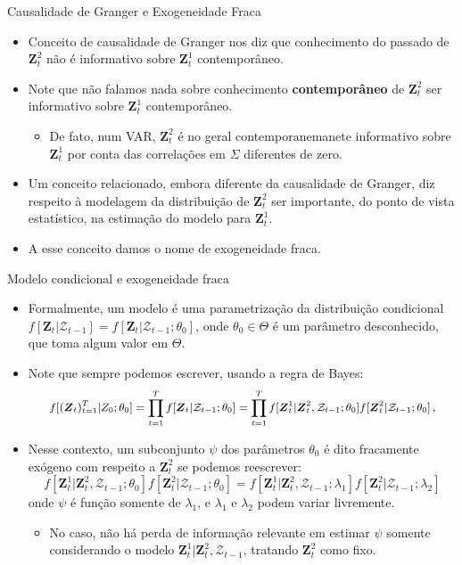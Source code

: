 \documentclass[11pt]{beamer}
\begin{document}
\begin{frame}{Causalidade de Granger e Exogeneidade Fraca}
\begin{itemize}
	\item Conceito de causalidade de Granger nos diz que conhecimento do passado de $\boldsymbol{Z}^2_t$ não é informativo sobre $\boldsymbol{Z}^1_t$ contemporâneo.
	\item Note que não falamos nada sobre conhecimento \textbf{contemporâneo} de $\boldsymbol{Z}^2_t$ ser informativo sobre   $\boldsymbol{Z}^1_t$ contemporâneo.
	\begin{itemize}
		\item De fato, num VAR, $\boldsymbol{Z}^2_t$ é no geral contemporanemanete informativo sobre  $\boldsymbol{Z}^1_t$ por conta das correlações em $\Sigma$ diferentes de zero.
	\end{itemize}
	\item Um conceito relacionado, embora diferente da causalidade de Granger, diz respeito à modelagem da distribuição de $\boldsymbol{Z}^2_t$ ser importante, do ponto de vista estatístico, na estimação do modelo para $\boldsymbol{Z}^1_t$.
	\item A esse conceito damos o nome de {\color{blue}exogeneidade fraca}.
\end{itemize}
\end{frame}
\begin{frame}{Modelo condicional e exogeneidade fraca}
	\begin{itemize}
		\item Formalmente, um modelo é uma parametrização da distribuição condicional  $f[\boldsymbol{Z}_t|\mathcal{Z}_{t-1}] = f[\boldsymbol{Z}_t|\mathcal{Z}_{t-1};\theta_0] $, onde $\theta_0 \in \Theta$ é um parâmetro desconhecido, que toma algum valor em $\Theta$.
		
		\item Note que sempre podemos escrever, usando a regra de Bayes:
			$$\small f[(\boldsymbol{Z}_t)_{t=1}^T|Z_0;\theta_0] = \prod_{t=1}^T f[\boldsymbol{Z}_t|\mathcal{Z}_{t-1};\theta_0] = \prod_{t=1}^T f[\boldsymbol{Z}_t^1|\boldsymbol{Z}^2_t,\mathcal{Z}_{t-1};\theta_0] f[\boldsymbol{Z}_t^2|\mathcal{Z}_{t-1};\theta_0] \, ,$$
		\item Nesse contexto, um subconjunto $\psi$ dos parâmetros $\theta_0$ é dito {\color{blue}fracamente exógeno com respeito a $\boldsymbol{Z}^2_t$} se podemos reescrever:
		$$f[\boldsymbol{Z}_t^1|\boldsymbol{Z}^2_t,\mathcal{Z}_{t-1};\theta_0] f[\boldsymbol{Z}_t^2|\mathcal{Z}_{t-1};\theta_0]  = f[\boldsymbol{Z}_t^1|\boldsymbol{Z}^2_t,\mathcal{Z}_{t-1};\lambda_1] f[\boldsymbol{Z}_t^2|\mathcal{Z}_{t-1};\lambda_2]  $$
		onde $\psi$ é  função somente de $\lambda_1$, e $\lambda_1$ e $\lambda_2$ podem variar {\color{blue}livremente}.
		\begin{itemize}
			\item No caso, não há perda de informação relevante em estimar $\psi$ somente considerando o modelo $\boldsymbol{Z}_t^1|\boldsymbol{Z}^2_t,\mathcal{Z}_{t-1}$, tratando $\boldsymbol{Z}^2_t$ como fixo.

		\end{itemize}
	\end{itemize}
\end{frame}
\end{document}
